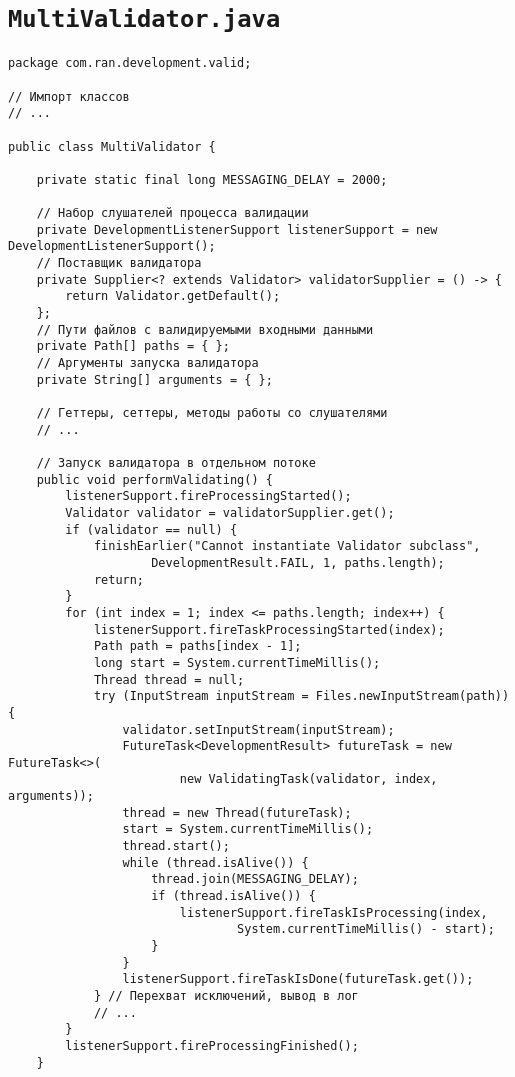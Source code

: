 \section*{\texttt{MultiValidator.java}}
\begin{verbatim}
package com.ran.development.valid;

// Импорт классов
// ...

public class MultiValidator {

    private static final long MESSAGING_DELAY = 2000;
    
    // Набор слушателей процесса валидации
    private DevelopmentListenerSupport listenerSupport = new DevelopmentListenerSupport();
    // Поставщик валидатора
    private Supplier<? extends Validator> validatorSupplier = () -> {
        return Validator.getDefault();
    };
    // Пути файлов с валидируемыми входными данными
    private Path[] paths = { };
    // Аргументы запуска валидатора
    private String[] arguments = { };
    
    // Геттеры, сеттеры, методы работы со слушателями
    // ...
    
    // Запуск валидатора в отдельном потоке
    public void performValidating() {
        listenerSupport.fireProcessingStarted();
        Validator validator = validatorSupplier.get();
        if (validator == null) {
            finishEarlier("Cannot instantiate Validator subclass",
                    DevelopmentResult.FAIL, 1, paths.length);
            return;
        }
        for (int index = 1; index <= paths.length; index++) {
            listenerSupport.fireTaskProcessingStarted(index);
            Path path = paths[index - 1];
            long start = System.currentTimeMillis();
            Thread thread = null;
            try (InputStream inputStream = Files.newInputStream(path)) {
                validator.setInputStream(inputStream);
                FutureTask<DevelopmentResult> futureTask = new FutureTask<>(
                        new ValidatingTask(validator, index, arguments));
                thread = new Thread(futureTask);
                start = System.currentTimeMillis();
                thread.start();
                while (thread.isAlive()) {
                    thread.join(MESSAGING_DELAY);
                    if (thread.isAlive()) {
                        listenerSupport.fireTaskIsProcessing(index,
                                System.currentTimeMillis() - start);
                    }
                }
                listenerSupport.fireTaskIsDone(futureTask.get());
            } // Перехват исключений, вывод в лог
            // ...
        }
        listenerSupport.fireProcessingFinished();
    }
    

\end{verbatim}
